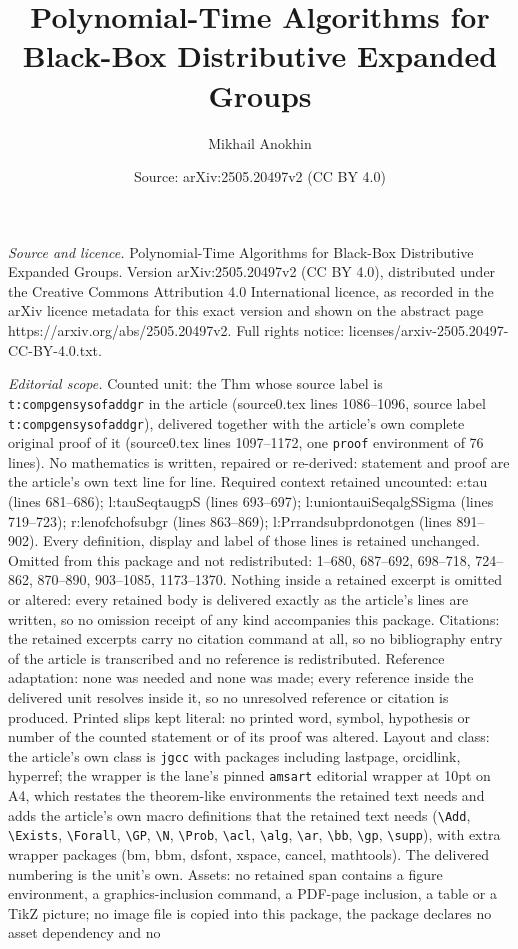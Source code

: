 \documentclass[10pt,a4paper]{amsart}
\title[Polynomial-Time Algorithms for Black-Box Distributive Expand]{Polynomial-Time Algorithms for Black-Box Distributive Expanded Groups}
\author{Mikhail Anokhin}
\date{Source: arXiv:2505.20497v2 (CC BY 4.0)}
\begin{document}
\maketitle

\noindent\emph{Source and licence.} Polynomial-Time Algorithms for Black-Box Distributive Expanded Groups. Version arXiv:2505.20497v2 (CC BY 4.0), distributed under the Creative Commons Attribution 4.0 International licence, as recorded in the arXiv licence metadata for this exact version and shown on the abstract page https://arxiv.org/abs/2505.20497v2. Full rights notice: licenses/arxiv-2505.20497-CC-BY-4.0.txt.\par\smallskip

\noindent\textit{Editorial scope.} Counted unit: the Thm whose source label is \texttt{t:compgensysofaddgr} in the article (source0.tex lines 1086--1096, source label \texttt{t:compgensysofaddgr}), delivered together with the article's own complete original proof of it (source0.tex lines 1097--1172, one \texttt{proof} environment of 76 lines). No mathematics is written, repaired or re-derived: statement and proof are the article's own text line for line. Required context retained uncounted: e:tau (lines 681--686); l:tauSeqtaugpS (lines 693--697); l:uniontauiSeqalgSSigma (lines 719--723); r:lenofchofsubgr (lines 863--869); l:Prrandsubprdonotgen (lines 891--902). Every definition, display and label of those lines is retained unchanged. Omitted from this package and not redistributed: 1--680, 687--692, 698--718, 724--862, 870--890, 903--1085, 1173--1370. Nothing inside a retained excerpt is omitted or altered: every retained body is delivered exactly as the article's lines are written, so no omission receipt of any kind accompanies this package. Citations: the retained excerpts carry no citation command at all, so no bibliography entry of the article is transcribed and no reference is redistributed. Reference adaptation: none was needed and none was made; every reference inside the delivered unit resolves inside it, so no unresolved reference or citation is produced. Printed slips kept literal: no printed word, symbol, hypothesis or number of the counted statement or of its proof was altered. Layout and class: the article's own class is \texttt{jgcc} with packages including lastpage, orcidlink, hyperref; the wrapper is the lane's pinned \texttt{amsart} editorial wrapper at 10pt on A4, which restates the theorem-like environments the retained text needs and adds the article's own macro definitions that the retained text needs (\texttt{\textbackslash Add}, \texttt{\textbackslash Exists}, \texttt{\textbackslash Forall}, \texttt{\textbackslash GP}, \texttt{\textbackslash N}, \texttt{\textbackslash Prob}, \texttt{\textbackslash acl}, \texttt{\textbackslash alg}, \texttt{\textbackslash ar}, \texttt{\textbackslash bb}, \texttt{\textbackslash gp}, \texttt{\textbackslash supp}), with extra wrapper packages (bm, bbm, dsfont, xspace, cancel, mathtools). The delivered numbering is the unit's own. Assets: no retained span contains a figure environment, a graphics-inclusion command, a PDF-page inclusion, a table or a TikZ picture; no image file is copied into this package, the package declares no asset dependency and no 
\end{document}
